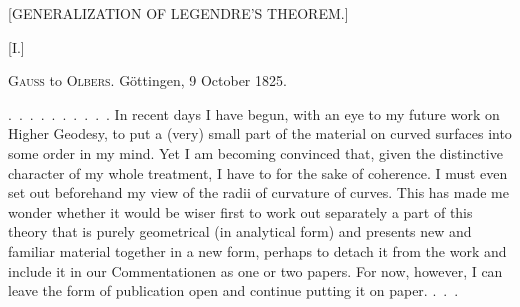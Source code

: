 \clearpage
{}
\begin{center}\large [GENERALIZATION OF LEGENDRE'S THEOREM.]\end{center}
\begin{center}[I.]\end{center}
\begin{center}\textsc{Gauss} to \textsc{Olbers}. Göttingen, 9 October 1825.\end{center}
\indent\mbox{. . . . . . . . . .} In recent days I have begun, with an eye to my future work on Higher Geodesy, to put a (very) small part of the material on curved surfaces into some order in my mind. Yet I am becoming convinced that, given the distinctive character of my whole treatment, I have to  for the sake of coherence. I must even set out beforehand my view of the radii of curvature of  curves. This has made me wonder whether it would be wiser first to work out separately a part of this theory that is purely geometrical (in analytical form) and presents new and familiar material together in a new form, perhaps to detach it from the work and include it in our Commentationen as one or two papers. For now, however, I can leave the form of publication open and continue putting it on paper. \mbox{. . .}
